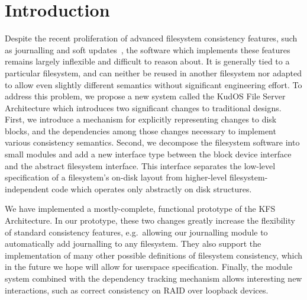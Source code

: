 \section*{Introduction}
\label{sec:intro}

Despite the recent proliferation of advanced filesystem consistency features,
such as journalling and soft updates~\cite{ganger00soft}, the software which
implements these features remains largely inflexible and difficult to reason
about. It is generally tied to a particular filesystem, and can neither be
reused in another filesystem nor adapted to allow even slightly different
semantics without significant engineering effort. To address this problem, we
propose a new system called the KudOS File Server Architecture which introduces
two significant changes to traditional designs. First, we introduce a mechanism
for explicitly representing changes to disk blocks, and the dependencies among
those changes necessary to implement various consistency semantics. Second, we
decompose the filesystem software into small modules and add a new interface
type between the block device interface and the abstract filesystem interface.
This interface separates the low-level specification of a filesystem's on-disk
layout from higher-level filesystem-independent code which operates only
abstractly on disk structures.

We have implemented a mostly-complete, functional prototype of the KFS
Architecture. In our prototype, these two changes greatly increase the
flexibility of standard consistency features, e.g.~allowing our journalling
module to automatically add journalling to any filesystem. They also support
the implementation of many other possible definitions of filesystem
consistency, which in the future we hope will allow for userspace
specification. Finally, the module system combined with the dependency
tracking mechanism allows interesting new interactions, such as correct
consistency on RAID over loopback devices.
